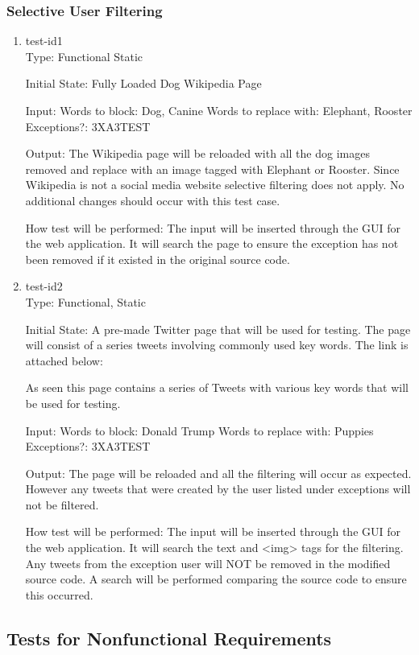 \documentclass[12pt, titlepage]{article}
\begin{document}
\subsubsection{Selective User Filtering}
\begin{enumerate}
\item{test-id1\\}
Type: Functional Static
					
Initial State: Fully Loaded Dog Wikipedia Page
					
Input: Words to block: Dog, Canine
Words to replace with: Elephant, Rooster
Exceptions?: 3XA3TEST
					
Output: The Wikipedia page will be reloaded with all the dog images removed and replace with an image tagged with Elephant or Rooster. Since Wikipedia is not a social media website selective filtering does not apply. No additional changes should occur with this test case.
					
How test will be performed: The input will be inserted through the GUI for the web application. It will search the page to ensure the exception has not been removed if it existed in the original source code.
					
\item{test-id2\\}
Type: Functional, Static
					
Initial State: A pre-made Twitter page that will be used for testing. The page will consist of  a series tweets involving commonly used key words. The link is attached below:

As seen this page contains a series of Tweets with various key words that will be used for testing.
					
Input:  Words to block: Donald Trump
Words to replace with: Puppies
Exceptions?: 3XA3TEST
					
Output: The page will be reloaded and all the filtering will occur as expected. However any tweets that were created by the user listed under exceptions will not be filtered.

How test will be performed: The input will be inserted through the GUI for the web application. It will search the text and <img> tags for the filtering. Any tweets from the exception user will NOT be removed in the modified source code. A search will be performed comparing the source code to ensure this occurred.
\end{enumerate}
\subsection{Tests for Nonfunctional Requirements}
\end{document}
